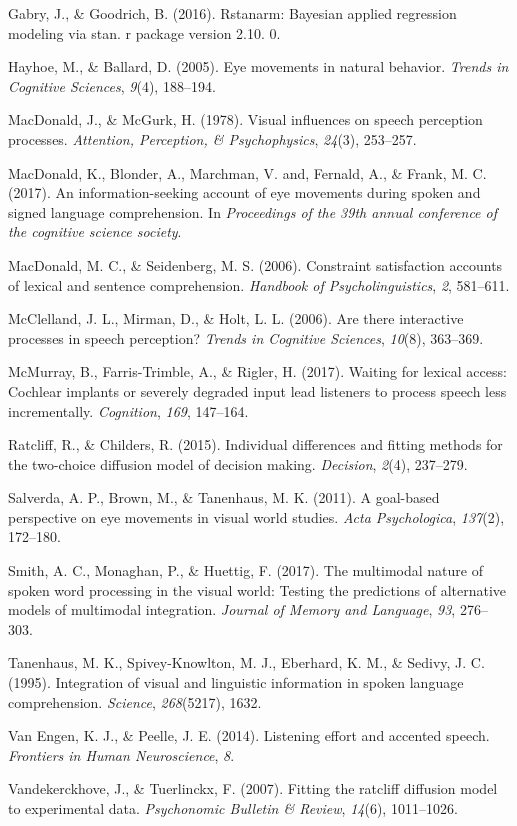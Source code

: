 \documentclass[10pt, letterpaper]{article}
\begin{document}
\hypertarget{ref-gabry2016rstanarm}{}
Gabry, J., \& Goodrich, B. (2016). Rstanarm: Bayesian applied regression
modeling via stan. r package version 2.10. 0.

\hypertarget{ref-hayhoe2005eye}{}
Hayhoe, M., \& Ballard, D. (2005). Eye movements in natural behavior.
\emph{Trends in Cognitive Sciences}, \emph{9}(4), 188--194.

\hypertarget{ref-macdonald1978visual}{}
MacDonald, J., \& McGurk, H. (1978). Visual influences on speech
perception processes. \emph{Attention, Perception, \& Psychophysics},
\emph{24}(3), 253--257.

\hypertarget{ref-macdonald2017info}{}
MacDonald, K., Blonder, A., Marchman, V. and, Fernald, A., \& Frank, M.
C. (2017). An information-seeking account of eye movements during spoken
and signed language comprehension. In \emph{Proceedings of the 39th
annual conference of the cognitive science society}.

\hypertarget{ref-macdonald2006constraint}{}
MacDonald, M. C., \& Seidenberg, M. S. (2006). Constraint satisfaction
accounts of lexical and sentence comprehension. \emph{Handbook of
Psycholinguistics}, \emph{2}, 581--611.

\hypertarget{ref-mcclelland2006there}{}
McClelland, J. L., Mirman, D., \& Holt, L. L. (2006). Are there
interactive processes in speech perception? \emph{Trends in Cognitive
Sciences}, \emph{10}(8), 363--369.

\hypertarget{ref-mcmurray2017waiting}{}
McMurray, B., Farris-Trimble, A., \& Rigler, H. (2017). Waiting for
lexical access: Cochlear implants or severely degraded input lead
listeners to process speech less incrementally. \emph{Cognition},
\emph{169}, 147--164.

\hypertarget{ref-ratcliff2015individual}{}
Ratcliff, R., \& Childers, R. (2015). Individual differences and fitting
methods for the two-choice diffusion model of decision making.
\emph{Decision}, \emph{2}(4), 237--279.

\hypertarget{ref-salverda2011goal}{}
Salverda, A. P., Brown, M., \& Tanenhaus, M. K. (2011). A goal-based
perspective on eye movements in visual world studies. \emph{Acta
Psychologica}, \emph{137}(2), 172--180.

\hypertarget{ref-smith2017multimodal}{}
Smith, A. C., Monaghan, P., \& Huettig, F. (2017). The multimodal nature
of spoken word processing in the visual world: Testing the predictions
of alternative models of multimodal integration. \emph{Journal of Memory
and Language}, \emph{93}, 276--303.

\hypertarget{ref-tanenhaus1995integration}{}
Tanenhaus, M. K., Spivey-Knowlton, M. J., Eberhard, K. M., \& Sedivy, J.
C. (1995). Integration of visual and linguistic information in spoken
language comprehension. \emph{Science}, \emph{268}(5217), 1632.

\hypertarget{ref-van2014listening}{}
Van Engen, K. J., \& Peelle, J. E. (2014). Listening effort and accented
speech. \emph{Frontiers in Human Neuroscience}, \emph{8}.

\hypertarget{ref-vandekerckhove2007fitting}{}
Vandekerckhove, J., \& Tuerlinckx, F. (2007). Fitting the ratcliff
diffusion model to experimental data. \emph{Psychonomic Bulletin \&
Review}, \emph{14}(6), 1011--1026.
\end{document}
